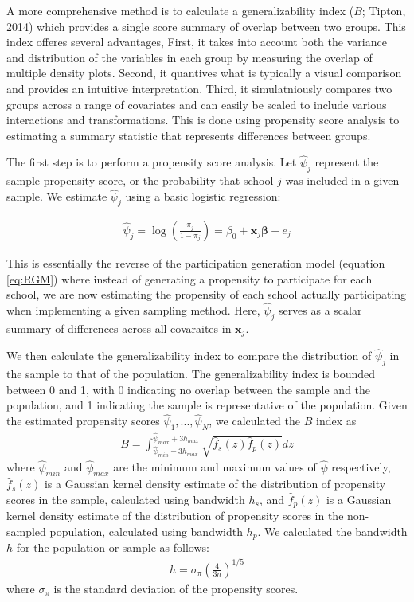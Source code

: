\documentclass[english,man,floatsintext]{apa6}
\begin{document}
A more comprehensive method is to calculate a generalizability index (\(B\); Tipton, 2014) which provides a single score summary of overlap between two groups. This index offeres several advantages, First, it takes into account both the variance and distribution of the variables in each group by measuring the overlap of multiple density plots. Second, it quantives what is typically a visual comparison and provides an intuitive interpretation. Third, it simulatniously compares two groups across a range of covariates and can easily be scaled to include various interactions and transformations. This is done using propensity score analysis to estimating a summary statistic that represents differences between groups.

The first step is to perform a propensity score analysis. Let \(\hat\psi_j\) represent the sample propensity score, or the probability that school \(j\) was included in a given sample. We estimate \(\hat\psi_j\) using a basic logistic regression:

\begin{align}
\label{eq:PSA}
\hat\psi_j = \log\left(\frac{\pi_j}{1 - \pi_j}\right) = \beta_0 + \mathbf{x}_j \boldsymbol\beta + e_j
\end{align}

This is essentially the reverse of the participation generation model (equation \eqref{eq:RGM}) where instead of generating a propensity to participate for each school, we are now estimating the propensity of each school actually participating when implementing a given sampling method. Here, \(\hat\psi_j\) serves as a scalar summary of differences across all covaraites in \(\mathbf{x}_j\). 

We then calculate the generalizability index to compare the distribution of \(\hat\psi_j\) in the sample to that of the population.
The generalizability index is bounded between 0 and 1, with 0 indicating no overlap between the sample and the population, and 1 indicating the sample is representative of the population.
Given the estimated propensity scores \(\hat\psi_1,...,\hat\psi_N\), we calculated the \(B\) index as
\begin{align}
B = \int_{\hat\psi_{min}-3h_{max}}^{\hat\psi_{max}+3h_{max}}\sqrt{\hat{f}_s(z)\hat{f}_p(z)}dz
\end{align}
where \(\hat\psi_{min}\) and \(\hat\psi_{max}\) are the minimum and maximum values of \(\hat\psi\) respectively, \(\hat{f}_s(z)\) is a Gaussian kernel density estimate of the distribution of propensity scores in the sample, calculated using bandwidth \(h_s\), and \(\hat{f}_p(z)\) is a Gaussian kernel density estimate of the distribution of propensity scores in the non-sampled population, calculated using bandwidth \(h_p\). We calculated the bandwidth \(h\) for the population or sample as follows:
\begin{align}
h = \sigma_{\pi}\left(\frac{4}{3n}\right)^{1/5}
\end{align}
where \(\sigma_{\pi}\) is the standard deviation of the propensity scores.
\end{document}
